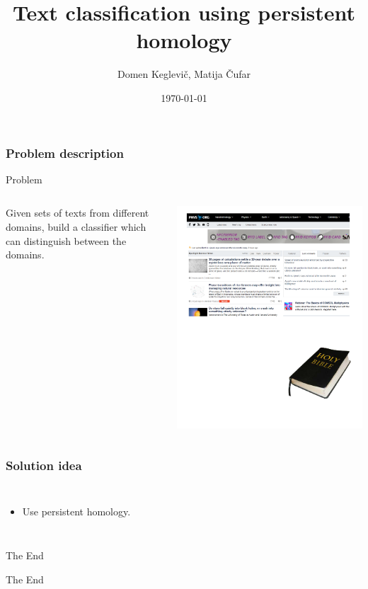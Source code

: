\documentclass[unknownkeysallowed]{beamer}
\title[Text Analysis]{Text classification using persistent homology} %
\author{Domen Keglevič, Matija Čufar} %
\institute[] %
{
Faculty of Computer and Information Science \\ %
\medskip
}
\date{\today} %
\begin{document}
\begin{frame}
\titlepage %
\end{frame}

\begin{frame}
\frametitle{Problem description} 
\begin{block}{Problem}
\begin{columns}[c]
	Given sets of texts from different domains, build a classifier which can distinguish between the domains.

	\includegraphics[width=0.9\linewidth]{different_domains}
\end{columns}
\end{block}

\end{frame}


\begin{frame}
\frametitle{Solution idea}
\begin{columns}[c]
	\begin{itemize}
		\item Use persistent homology.
		\medskip
	\end{itemize}
	
\end{columns}
\end{frame}


\begin{frame}{The End}
\Huge{\centerline{The End}}
\end{frame}

\end{document}
